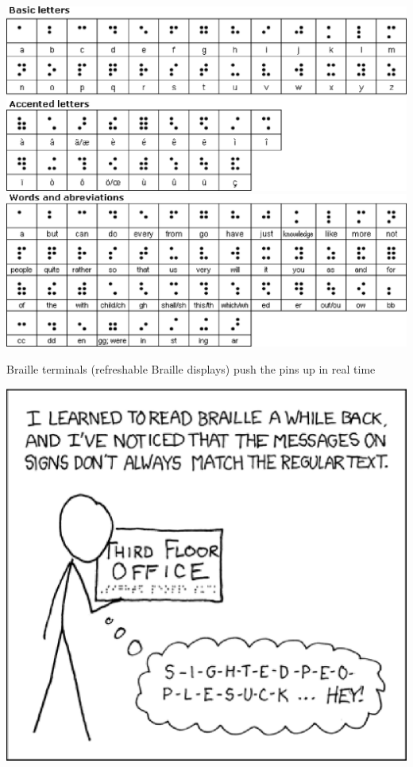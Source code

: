 \documentclass[a4paper,landscape,headrule,footrule,xetex]{foils}
\begin{document}

\includegraphics{../pics/braille_basic.eps}
\newpage
\includegraphics{../pics/braille_abbrr.eps}

Braille terminals (refreshable Braille displays) push the pins up in
real time


\includegraphics{../pics/braille-xkcd.eps}
\end{document}
